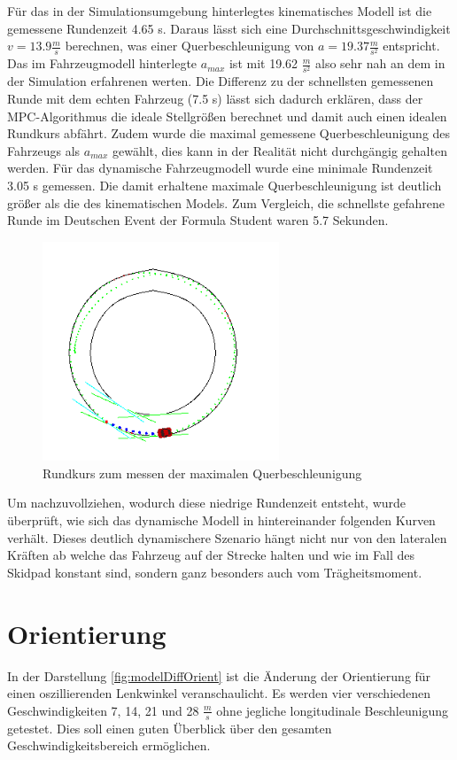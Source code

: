 \documentclass{like}
\begin{document}
Für das in der Simulationsumgebung hinterlegtes kinematisches Modell ist die gemessene Rundenzeit 4.65 s. Daraus lässt sich eine Durchschnittsgeschwindigkeit $ v= 13.9 \frac{m}{s}$ berechnen, was einer Querbeschleunigung von $a = 19.37 \frac{m}{s^2}$ entspricht. Das im Fahrzeugmodell hinterlegte $a_{max}$ ist mit 19.62 $ \frac{m}{s^2}$ also sehr nah an dem in der Simulation erfahrenen werten. Die Differenz zu der schnellsten gemessenen Runde mit dem echten Fahrzeug (7.5 s) lässt sich dadurch erklären, dass der MPC-Algorithmus die ideale Stellgrößen berechnet und damit auch einen idealen Rundkurs abfährt. Zudem wurde die maximal gemessene Querbeschleunigung des Fahrzeugs als $a_{max}$ gewählt, dies kann in der Realität nicht durchgängig gehalten werden.
Für das dynamische Fahrzeugmodell wurde eine minimale Rundenzeit 3.05 s gemessen.  Die damit erhaltene maximale Querbeschleunigung ist deutlich größer als die des kinematischen Models. Zum Vergleich, die schnellste gefahrene Runde im Deutschen Event der Formula Student waren 5.7 Sekunden.

\begin{figure}
	\centering
	\includegraphics[width=200pt]{Abbildungen/roundCourse.png}
	\caption{Rundkurs zum messen der maximalen Querbeschleunigung}
	\label{fig:roundCourse}
\end{figure}

Um nachzuvollziehen, wodurch diese niedrige Rundenzeit entsteht, wurde überprüft, wie sich das dynamische Modell in hintereinander folgenden Kurven verhält.
Dieses deutlich dynamischere Szenario hängt nicht nur von den lateralen Kräften ab welche das Fahrzeug auf der Strecke halten und wie im Fall des Skidpad konstant sind, sondern ganz besonders auch vom Trägheitsmoment. 

\section{Orientierung}
In der Darstellung \ref{fig:modelDiffOrient} ist die Änderung der Orientierung für einen oszillierenden Lenkwinkel veranschaulicht. Es werden vier verschiedenen Geschwindigkeiten 7, 14, 21 und 28 $\frac{m}{s}$ ohne jegliche longitudinale Beschleunigung getestet. Dies soll einen guten Überblick über den gesamten Geschwindigkeitsbereich ermöglichen.
\end{document}

